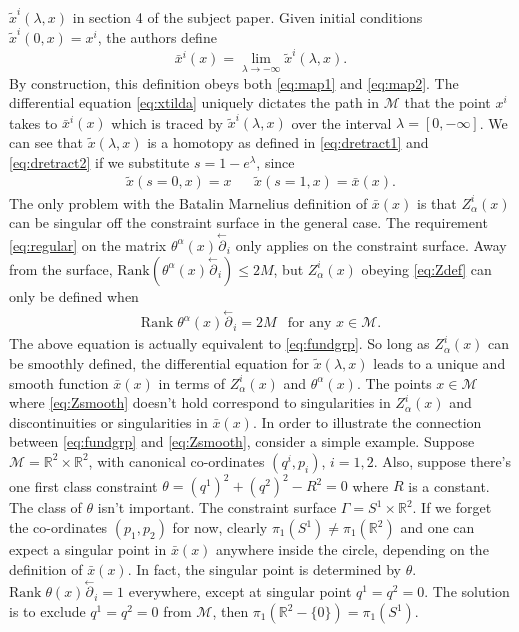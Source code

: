 \documentclass[a4paper,12pt]{article}
\theoremstyle{definition}
\theoremstyle{remark}
\numberwithin{equation}{section}
\newcommand{\al}{\alpha}
\newcommand{\la}{\lambda}
\newcommand{\Real}{\mathbb R}
\newcommand{\ra}{\rightarrow}
\newcommand{\M}{\mathcal{M}}
\newcommand{\bx}{\bar{x}}
\newcommand{\tx}{\tilde{x}}
\newcommand{\pl}{\overset{\leftarrow}{\partial}}
\begin{document}
$\tx^i(\la,x)$ in section 4 of the subject paper. Given initial
conditions $\tx^i(0,x)=x^i$, the authors define
\begin{equation}
\bx^i(x)=\lim_{\la \ra -\infty} \tx^i(\la,x).
\end{equation}
By construction, this definition obeys both \eqref{eq:map1} and
\eqref{eq:map2}. The differential equation \eqref{eq:xtilda}
uniquely dictates the path in $\M$ that the point $x^i$ takes to
$\bx^i(x)$ which is traced by $\tx^i(\la,x)$ over the interval
$\la=[0,-\infty]$. We can see that $\tx(\lambda,x)$ is a homotopy
as defined in \eqref{eq:dretract1} and \eqref{eq:dretract2} if we
substitute $s=1-e^{\lambda}$, since
\begin{eqnarray}
\tx(s=0,x)=x && \tx(s=1,x)=\bx(x).
\end{eqnarray}
The only problem with the Batalin Marnelius definition of $\bx(x)$
is that $Z^i_{\al}(x)$ can be singular off the constraint surface
in the general case. The requirement \eqref{eq:regular} on the
matrix $\theta^{\al}(x)\pl_i$ only applies on the constraint
surface. Away from the surface, $\text{Rank
}(\theta^{\al}(x)\pl_i) \leq 2M$, but $Z^i_{\al}(x)$ obeying
\eqref{eq:Zdef} can only be defined when
\begin{eqnarray}\label{eq:Zsmooth}
\text{Rank}\;\theta^{\al}(x)\pl_i = 2M & \text{for any } x \in \M.
\end{eqnarray}
The above equation is actually equivalent to \eqref{eq:fundgrp}.
So long as $Z^i_{\al}(x)$ can be smoothly defined, the
differential equation for $\tx(\la,x)$ leads to a unique and
smooth function $\bx(x)$ in terms of $Z^i_{\al}(x)$ and
$\theta^{\al}(x)$. The points $x \in \M$ where \eqref{eq:Zsmooth}
doesn't hold correspond to singularities in $Z^i_{\al}(x)$ and
discontinuities or singularities in $\bx(x)$. In order to
illustrate the connection  between \eqref{eq:fundgrp} and
\eqref{eq:Zsmooth}, consider a simple example. Suppose
$\M=\Real^2\times\Real^2$, with canonical co-ordinates $(q^i,
p_i)$, $i=1,2$. Also, suppose there's one first class constraint
$\theta=(q^1)^2+(q^2)^2-R^2=0$ where $R$ is a constant. The class
of $\theta$ isn't important. The constraint surface
$\Gamma=S^1\times\Real^2$. If we forget the co-ordinates
$(p_1,p_2)$ for now, clearly $\pi_1(S^1) \neq\pi_1(\Real^2)$ and
one can expect a singular point in $\bx(x)$ anywhere inside the
circle, depending on the definition of $\bx(x)$. In fact, the
singular point is determined by $\theta$.
$\text{Rank}\;\theta(x)\pl_i=1$ everywhere, except at singular
point $q^1=q^2=0$. The solution is to exclude $q^1=q^2=0$ from
$\M$, then $\pi_1(\Real^2-\{0\})=\pi_1(S^1)$.
\end{document}
